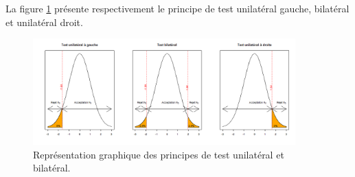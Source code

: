 \documentclass[10pt, oneside, a4paper]{article}
\begin{document}

\hspace{-0.5 cm}La figure \ref{fig:bi_uni} présente respectivement le principe de test unilatéral gauche, bilatéral et unilatéral droit.
\begin{figure}[htbp]
    \centering
    \includegraphics[width=0.9\textwidth]{image/bi_uni}    
    \caption{Représentation graphique des principes de test unilatéral et bilatéral.}    
    \label{fig:bi_uni}
\end{figure}
\end{document}
